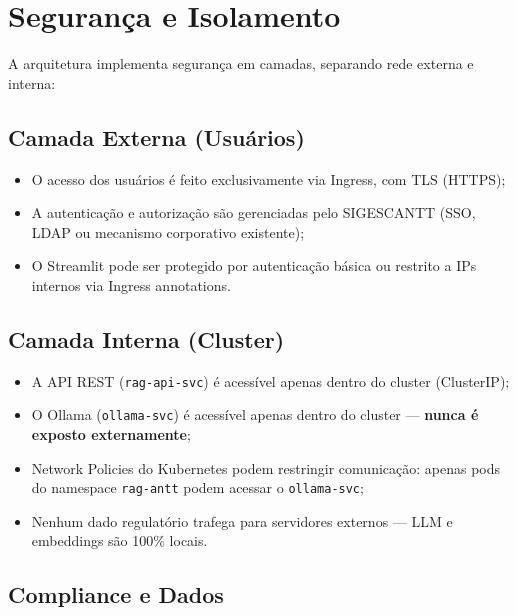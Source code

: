 \documentclass[12pt, a4paper]{article}
\begin{document}
\section{Segurança e Isolamento}

A arquitetura implementa segurança em camadas, separando rede externa e interna:

\subsection{Camada Externa (Usuários)}

\begin{itemize}
  \item O acesso dos usuários é feito exclusivamente via Ingress, com TLS (HTTPS);
  \item A autenticação e autorização são gerenciadas pelo SIGESCANTT (SSO, LDAP ou mecanismo corporativo existente);
  \item O Streamlit pode ser protegido por autenticação básica ou restrito a IPs internos via Ingress annotations.
\end{itemize}

\subsection{Camada Interna (Cluster)}

\begin{itemize}
  \item A API REST (\texttt{rag-api-svc}) é acessível apenas dentro do cluster (ClusterIP);
  \item O Ollama (\texttt{ollama-svc}) é acessível apenas dentro do cluster --- \textbf{nunca é exposto externamente};
  \item Network Policies do Kubernetes podem restringir comunicação: apenas pods do namespace \texttt{rag-antt} podem acessar o \texttt{ollama-svc};
  \item Nenhum dado regulatório trafega para servidores externos --- LLM e embeddings são 100\% locais.
\end{itemize}

\subsection{Compliance e Dados}
\end{document}
